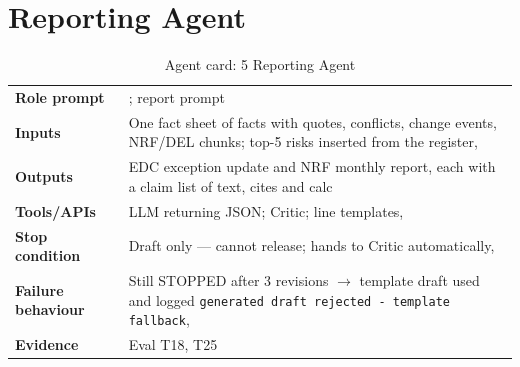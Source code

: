 \section{Reporting Agent}
\begin{table}[H]
\centering\footnotesize
\caption{Agent card: 5 Reporting Agent}
\label{tab:card-reporting}
\begin{tabularx}{\textwidth}{>{\raggedright\arraybackslash}p{2.9cm}L}
\toprule
\textbf{Role prompt} & ; report prompt  \\
\textbf{Inputs} & One fact sheet of facts with quotes, conflicts, change events, NRF/DEL chunks; top-5 risks inserted from the register,  \\
\textbf{Outputs} & EDC exception update and NRF monthly report, each with a claim list of text, cites and calc \\
\textbf{Tools/APIs} & LLM returning JSON; Critic; line templates,  \\
\textbf{Stop condition} & Draft only --- cannot release; hands to Critic automatically,  \\
\textbf{Failure behaviour} & Still STOPPED after 3 revisions $\rightarrow$ template draft used and logged \texttt{generated draft rejected - template fallback},  \\
\textbf{Evidence} & Eval T18, T25 \\
\bottomrule
\end{tabularx}
\end{table}

